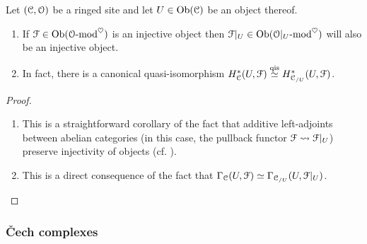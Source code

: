             \begin{proposition} \label{prop: injectivity_is_preserved_by_restrictions}
                Let $(\mathcal{C}, \mathcal{O})$ be a ringed site and let $U \in \mathrm{Ob}(\mathcal{C})$ be an object thereof. 
                    \begin{enumerate}
                        \item If $\mathcal{F} \in \mathrm{Ob}(\mathcal{O}\text{-}\mathrm{mod}^{\heartsuit})$ is an injective object then $\mathcal{F}|_U \in \mathrm{Ob}(\mathcal{O}|_U\text{-}\mathrm{mod}^{\heartsuit})$ will also be an injective object. 
                        \item In fact, there is a canonical quasi-isomorphism $H^*_{\mathcal{C}}(U, \mathcal{F}) \overset{\mathrm{qis}}{\simeq} H^*_{\mathcal{C}_{/U}}(U, \mathcal{F})$.
                    \end{enumerate}
            \end{proposition}
                \begin{proof}
                    \noindent
                    \begin{enumerate}
                        \item This is a straightforward corollary of the fact that additive left-adjoints between abelian categories (in this case, the pullback functor $\mathcal{F} \leadsto \mathcal{F}|_U$) preserve injectivity of objects (cf. \cite[\href{https://stacks.math.columbia.edu/tag/015Z}{Tag 015Z}]{stacks}).
                        \item This is a direct consequence of the fact that $\Gamma_{\mathcal{C}}(U, \mathcal{F}) \simeq \Gamma_{\mathcal{C}_{/U}}(U, \mathcal{F}|_U)$.
                    \end{enumerate}
                \end{proof}
        
        \subsubsection{\v{C}ech complexes}
            \begin{definition} \label{def: the_cech_complex}
                
            \end{definition}